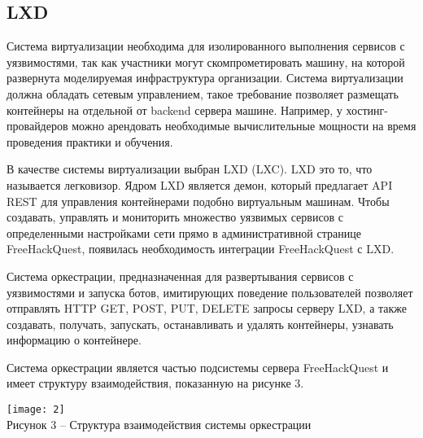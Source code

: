 \subsection{LXD}
Система виртуализации необходима для изолированного выполнения сервисов с уязвимостями, так как участники могут скомпрометировать машину, на которой развернута моделируемая инфраструктура организации. Система виртуализации должна обладать сетевым управлением, такое требование позволяет размещать контейнеры на отдельной от backend сервера машине. Например, у хостинг-провайдеров можно арендовать необходимые вычислительные мощности на время проведения практики и обучения.\par
В качестве системы виртуализации выбран LXD (LXC). LXD это то, что называется легковизор. Ядром LXD является демон, который предлагает API REST для управления контейнерами подобно виртуальным машинам. Чтобы создавать, управлять и мониторить множество уязвимых сервисов с определенными настройками сети прямо в административной странице FreeHackQuest, появилась необходимость интеграции FreeHackQuest с LXD.\par
Система оркестрации, предназначенная для развертывания сервисов с уязвимостями и запуска ботов, имитирующих поведение пользователей позволяет отправлять HTTP GET, POST, PUT, DELETE запросы серверу LXD, а также создавать, получать, запускать, останавливать и удалять контейнеры, узнавать информацию о контейнере.\par
Система оркестрации является частью подсистемы сервера FreeHackQuest и имеет структуру взаимодействия, показанную на рисунке 3.\par
\begin{center}
\texttt{[image: 2]}\\
Рисунок 3 -- Структура взаимодействия системы оркестрации\\
\end{center}
\vspace{\baselineskip}
\clearpage